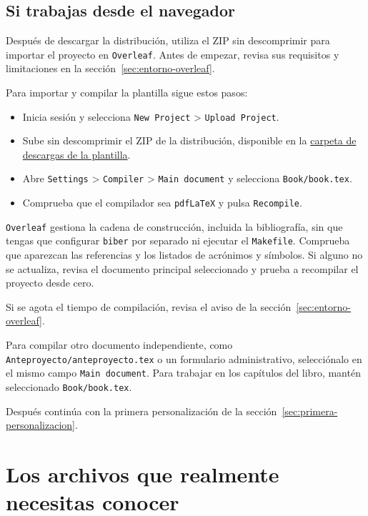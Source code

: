 \subsection{Si trabajas desde el navegador}
\label{sec:compilacion-navegador}
\label{sec:compilacion-overleaf}

Después de descargar la distribución, utiliza el ZIP sin descomprimir para importar el proyecto en \texttt{Overleaf}. Antes de empezar, revisa sus requisitos y limitaciones en la sección~\ref{sec:entorno-overleaf}.

Para importar y compilar la plantilla sigue estos pasos:

\begin{itemize}
  \item Inicia sesión y selecciona \texttt{New Project} > \texttt{Upload Project}.
  \item Sube sin descomprimir el ZIP de la distribución, disponible en la \href{https://www.dropbox.com/sh/mm6fwh3ruuuyjz2/AABDUmo7Xj1S968FeJgbmFPva?dl=0}{carpeta de descargas de la plantilla}.
  \item Abre \texttt{Settings} > \texttt{Compiler} > \texttt{Main document} y selecciona \texttt{Book/book.tex}.
  \item Comprueba que el compilador sea \texttt{pdfLaTeX} y pulsa \texttt{Recompile}.
\end{itemize}

\texttt{Overleaf} gestiona la cadena de construcción, incluida la bibliografía, sin que tengas que configurar \texttt{biber} por separado ni ejecutar el \texttt{Makefile}. Comprueba que aparezcan las referencias y los listados de acrónimos y símbolos. Si alguno no se actualiza, revisa el documento principal seleccionado y prueba a recompilar el proyecto desde cero.

Si se agota el tiempo de compilación, revisa el aviso de la sección~\ref{sec:entorno-overleaf}.

Para compilar otro documento independiente, como \texttt{Anteproyecto/anteproyecto.tex} o un formulario administrativo, selecciónalo en el mismo campo \texttt{Main document}. Para trabajar en los capítulos del libro, mantén seleccionado \texttt{Book/book.tex}.

Después continúa con la primera personalización de la sección~\ref{sec:primera-personalizacion}.

\section{Los archivos que realmente necesitas conocer}
\label{sec:archivos-esenciales}

